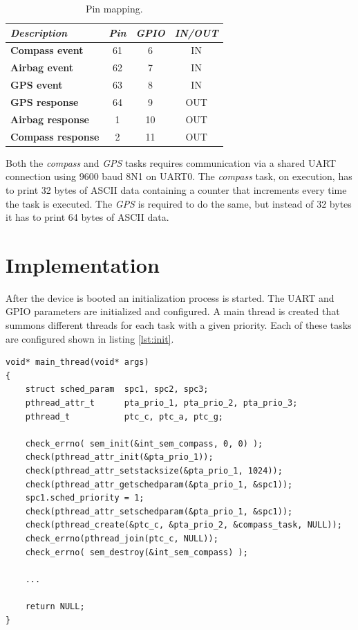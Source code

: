 \documentclass[10pt]{article}
\begin{document}
\begin{table}[H]
    \centering
    \begin{tabular}{|l|c|c|c|}
        \hline
        \textcolor{darkpink}{\textit{Description}}& \textcolor{darkpink}{\textit{Pin}} & \textcolor{darkpink}{\textit{GPIO}} &  \textcolor{darkpink}{\textit{IN/OUT}} \\
        \hline
        \textbf{Compass event} & 61 & 6 &  IN  \\
        \hline
        \textbf{Airbag event} & 62 &  7 &  IN  \\
        \hline
        \textbf{GPS event} & 63 & 8 &  IN  \\
        \hline
        \textbf{GPS response} & 64 & 9 &  OUT  \\
        \hline
        \textbf{Airbag response} & 1 & 10 &  OUT  \\
        \hline
        \textbf{Compass response} & 2 & 11 &  OUT  \\
        \hline
    \end{tabular}

    \caption{Pin mapping.}
    \label{tab:pins}
\end{table}

Both the \textit{compass} and \textit{GPS} tasks requires communication via a shared UART connection using 9600 baud 8N1 on UART0. The \textit{compass} task, on execution, has to print 32 bytes of ASCII data containing a counter
that increments every time the task is executed. The \textit{GPS} is required to do the same, but instead of 32 bytes it has to print 64 bytes of ASCII data.

\newpage
\section*{Implementation}

After the device is booted an initialization process is started. The UART and GPIO parameters are initialized and configured.
A main thread is created that summons different threads for each task with a given priority. Each of these
tasks are configured shown in listing \ref{lst:init}.

\begin{lstlisting}[style=CStyle, caption={Initialization}, captionpos=b, label={lst:init}, escapechar=@]
void* main_thread(void* args)
{
    struct sched_param  spc1, spc2, spc3;
    pthread_attr_t      pta_prio_1, pta_prio_2, pta_prio_3;
    pthread_t           ptc_c, ptc_a, ptc_g;

    check_errno( sem_init(&int_sem_compass, 0, 0) );
    check(pthread_attr_init(&pta_prio_1));
    check(pthread_attr_setstacksize(&pta_prio_1, 1024));
    check(pthread_attr_getschedparam(&pta_prio_1, &spc1));
    spc1.sched_priority = 1;
    check(pthread_attr_setschedparam(&pta_prio_1, &spc1));
    check(pthread_create(&ptc_c, &pta_prio_2, &compass_task, NULL));
    check_errno(pthread_join(ptc_c, NULL));
    check_errno( sem_destroy(&int_sem_compass) );
	
	...

    return NULL;
}

\end{lstlisting}
\end{document}
